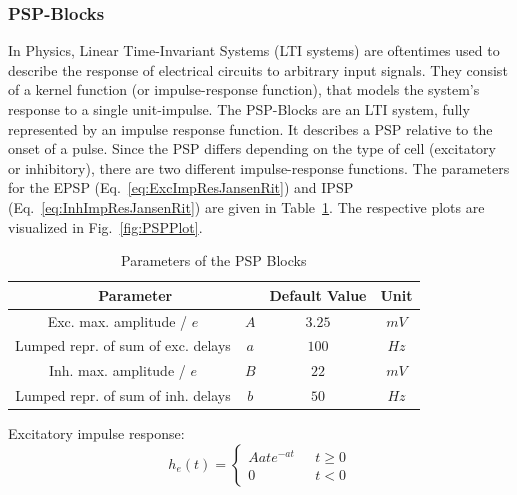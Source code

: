 \subsubsection{PSP-Blocks}
In Physics, Linear Time-Invariant Systems (LTI systems) are oftentimes used to describe the response of
electrical circuits to arbitrary input signals.
They consist of a kernel function (or impulse-response function),
that models the system's response to a single unit-impulse.
The PSP-Blocks are an LTI system, fully represented by an impulse response function.
It describes a PSP relative to the onset of a pulse.
Since the PSP differs depending on the type of cell (excitatory or inhibitory),
there are two different impulse-response functions.
The parameters for the EPSP (Eq.~\ref{eq:ExcImpResJansenRit}) and IPSP (Eq.~\ref{eq:InhImpResJansenRit})
are given in Table~\ref{tab:psp_params}.
The respective plots are visualized in Fig.~\ref{fig:PSPPlot}.
\begin{table}[H]
    \centering
    \begin{tabular}{ |c|c|c|c| }
        \hline
        \multicolumn{2}{|c|}{Parameter} & Default Value & Unit \\
        \hline
        \hline
        Exc. max. amplitude / $e$          & \(A\) & \(3.25\) & \(mV\) \\
        \hline
        Lumped repr. of sum of exc. delays & \(a\) & \(100\)  & \(Hz\) \\
        \hline
        Inh. max. amplitude / $e$          & \(B\) & \(22\)   & \(mV\) \\
        \hline
        Lumped repr. of sum of inh. delays & \(b\) & \(50\)   & \(Hz\) \\
        \hline
    \end{tabular}
    \caption{Parameters of the PSP Blocks}
    \label{tab:psp_params}
\end{table}

Excitatory impulse response:
\begin{equation}
    h_e(t) = \begin{cases}
                 Aate^{-at} & \mbox{ } t \geq 0 \\
                 0 & \mbox{ } t < 0
    \end{cases} \label{eq:ExcImpResJansenRit}
\end{equation}

